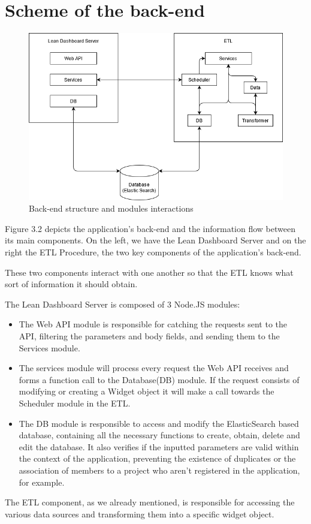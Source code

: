 \documentclass[a4paper,twoside,10pt]{report}
\begin{document}
\section{Scheme of the back-end}
\begin{figure}[h!]
\center
    \includegraphics[width=\textwidth]{arquitetura software.png}
    \caption{Back-end structure and modules interactions}
\end{figure}
Figure 3.2 depicts the application's back-end and the information flow between its main components. On the left, we have the Lean Dashboard Server and on the right the ETL Procedure, the two key components of the application's back-end.

These two components interact with one another so that the ETL knows what sort of information it should obtain.

The Lean Dashboard Server is composed of 3 Node.JS\cite{NODE} modules:
\begin{itemize}
  \item The Web API module is responsible for catching the requests sent to the API, filtering the parameters and body fields, and sending them to the Services module.
  \item The services module will process every request the Web API receives and forms a function call to the Database(DB) module. If the request consists of modifying or creating a Widget object it will make a call towards the Scheduler module in the ETL.
  \item The DB module is responsible to access and modify the ElasticSearch based database, containing all the necessary functions to create, obtain, delete and edit the database. It also verifies if the inputted parameters are valid within the context of the application, preventing the existence of duplicates or the association of members to a project who aren't registered in the application, for example.
\end{itemize}
\newpage
The ETL component, as we already mentioned, is responsible for accessing the various data sources and transforming them into a specific widget object.
\end{document}
